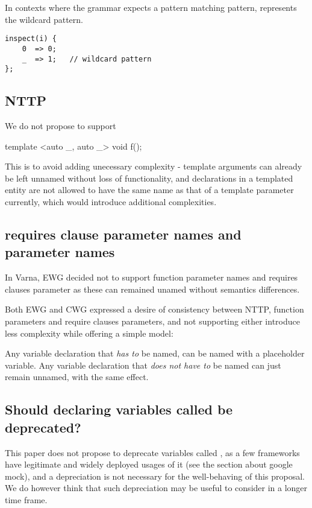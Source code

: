 \documentclass{wg21}
\begin{document}
In contexts where the grammar expects a pattern matching pattern, \tcode{_} represents the wildcard pattern.

\begin{lstlisting}[style=color]
inspect(i) {
    0  => 0;
    _  => 1;   // wildcard pattern
};
\end{lstlisting}

\subsection{NTTP}

We do not propose to support

\begin{colorblock}
template <auto _, auto _>
void f();
\end{colorblock}

This is to avoid adding unecessary complexity - template arguments can already be left unnamed without loss of functionality, and declarations in a templated entity are not allowed to have the same name as that of a template parameter currently, which would introduce additional complexities.

\subsection{requires clause parameter names and parameter names}

In Varna, EWG decided not to support function parameter names and requires clauses
parameter as these can remained unamed without semantics differences.

Both EWG and CWG expressed a desire of consistency between NTTP,
function parameters and require clauses parameters, and not supporting either
introduce less complexity while offering a simple model:

Any variable declaration that \emph{has to} be named, can be named with a \tcode{_} placeholder variable.
Any variable declaration that \emph{does not have to} be named can just remain unnamed, with the same effect.


\subsection{Should declaring variables called \tcode{_} be deprecated?}

This paper does not propose to deprecate variables called \tcode{_}, as a few frameworks have legitimate and widely deployed usages of it
(see the section about google mock), and a depreciation is not necessary for the well-behaving of this proposal.
We do however think that such depreciation may be useful to consider in a longer time frame.
\end{document}
